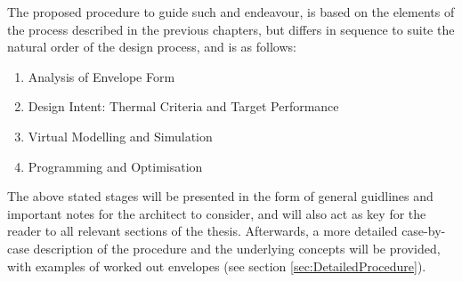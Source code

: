 The proposed procedure to guide such and endeavour, is based on the elements of the process described in the previous chapters, but differs in sequence to suite the natural order of the design process, and is as follows:

\begin{enumerate}
	\item Analysis of Envelope Form
	\item Design Intent: Thermal Criteria and Target Performance
	\item Virtual Modelling and Simulation
	\item Programming and Optimisation
\end{enumerate}

The above stated stages will be presented in the form of general guidlines and important notes for the architect to consider, and will also act as key for the reader to all relevant sections of the thesis. Afterwards, a more detailed case-by-case description of the procedure and the underlying concepts will be provided, with examples of worked out envelopes (see section \ref{sec:DetailedProcedure}).

